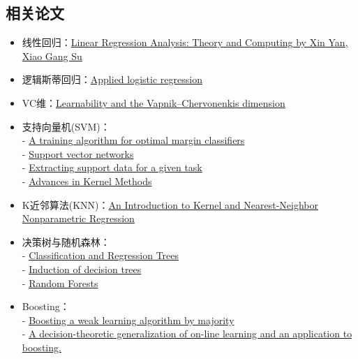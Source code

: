 \documentclass[lang=cn,11pt,a4paper]{elegant_template}
\begin{document}
\subsection{相关论文}
\begin{itemize}
    \item 线性回归：\href{https://www.researchgate.net/publication/227373853_Linear_Regression_Analysis_Theory_and_Computing_by_Xin_Yan_Xiao_Gang_Su}{Linear Regression Analysis: Theory and Computing by Xin Yan, Xiao Gang Su} 
    \item 逻辑斯蒂回归：\href{https://www.wiley.com/en-us/Applied+Logistic+Regression\%2C+3rd+Edition-p-9780470582473}{Applied logistic regression} 
    \item VC维：\href{https://dl.acm.org/doi/10.1145/76359.76371}{Learnability and the Vapnik–Chervonenkis dimension} 
    \item 支持向量机(SVM)：\\
    - \href{https://dl.acm.org/doi/10.1145/130385.130401}{A training algorithm for optimal margin classifiers} \\
    - \href{https://dl.acm.org/doi/10.1023/A\%3A1022627411411}{Support vector networks}  \\
    - \href{https://www.aaai.org/Papers/KDD/1995/KDD95-030.pdf}{Extracting support data for a given task} \\
    - \href{https://dl.acm.org/doi/10.1023/A\%3A1022627411411}{Advances in Kernel Methods}
    \item K近邻算法(KNN)：\href{https://citeseerx.ist.psu.edu/viewdoc/download?doi=10.1.1.1010.2854&rep=rep1&type=pdf}{An Introduction to Kernel and Nearest-Neighbor Nonparametric Regression} 
    \item 决策树与随机森林：\\
    - \href{https://onlinelibrary.wiley.com/doi/abs/10.1002/cyto.990080516}{Classification and Regression Trees} \\
    - \href{https://dl.acm.org/doi/10.1023/A\%3A1022643204877}{Induction of decision trees} \\
    - \href{https://link.springer.com/article/10.1023/A:1010933404324}{Random Forests} 
    \item Boosting：\\
    - \href{https://cseweb.ucsd.edu/~yfreund/papers/BoostByMajority.pdf}{Boosting a weak learning algorithm by majority} \\
    - \href{https://www.face-rec.org/algorithms/Boosting-Ensemble/decision-theoretic_generalization.pdf}{A decision-theoretic generalization of on-line learning and an application to boosting.} \\

\end{itemize}
\end{document}

